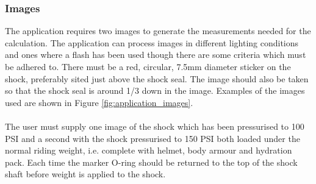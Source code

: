 		\subsubsection{Images}
			The application requires two images to generate the measurements needed for the calculation. The application can process images in different lighting conditions and ones where a flash has been used though there are some criteria which must be adhered to. There must be a red, circular, 7.5mm diameter sticker on the shock, preferably sited just above the shock seal. The image should also be taken so that the shock seal is around 1/3 down in the image. Examples of the images used are shown in Figure \ref{fig:application_images}.
			\\\\
			The user must supply one image of the shock which has been pressurised to 100 PSI and a second with the shock pressurised to 150 PSI both loaded under the normal riding weight, i.e. complete with helmet, body armour and hydration pack. Each time the marker O-ring should be returned to the top of the shock shaft before weight is applied to the shock.
